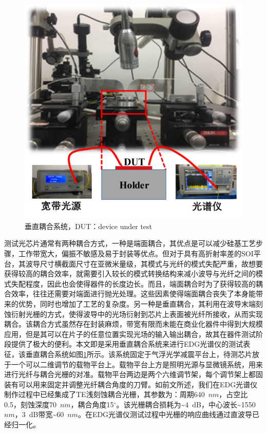 \begin{figure}[htb]
	\centering
	\includegraphics[width=12cm]{./Pictures/edg_setup.jpg}
	\captionsetup{justification=centering}
	\caption{垂直耦合系统，DUT：device under test}
	\label{edg_setup}
\end{figure}

测试光芯片通常有两种耦合方式，一种是端面耦合，其优点是可以减少硅基工艺步骤，工作带宽大，偏振不敏感及易于封装等优点。但对于具有高折射率差的SOI平台，其波导尺寸横截面尺寸在亚微米量级，其模式与光纤的模式失配严重，故想要获得较高的耦合效率，就需要引入较长的模式转换结构来减小波导与光纤之间的模式失配程度，因此也会使得器件的长度边长。而且，端面耦合时为了获得较高的耦合效率，往往还需要对端面进行抛光处理。这些因素使得端面耦合丧失了本身能带来的优势，同时也增加了工艺的复杂度。另一种是垂直耦合，其利用在波导末端刻蚀衍射光栅的方式，使得波导中的光场衍射到芯片上表面被光纤所接收，从而实现耦合。该耦合方式虽然存在封装麻烦，带宽有限而未能在商业化器件中得到大规模应用，但是其可以在片子的任意位置实现光场的输入输出耦合，故其在器件测试阶段提供了极大的便利。本文即是采用垂直耦合系统来进行EDG光谱仪的测试表征，该垂直耦合系统如图\ref{edg_setup}所示。该系统固定于气浮光学减震平台上，待测芯片放于一个可以二维调节的载物平台上。载物平台上方是照明光源与显微镜系统，用来进行光纤与耦合光栅的对准。载物平台两边是两个六维调节架，每个调节架上都固装有可以用来固定并调整光纤耦合角度的刀臂。如前文所述，我们在EDG光谱仪制作过程中已经集成了TE浅刻蚀耦合光栅，其参数为：周期640~$nm$，占空比0.5，刻蚀深度70~$nm$，耦合角度15$^{\circ}$。该光栅耦合损耗为\~{}4~dB，中心波长\~{}1550~$nm$，3~dB带宽\~{}60~$nm$。在EDG光谱仪测试过程中光栅的响应曲线通过直波导已经归一化。


